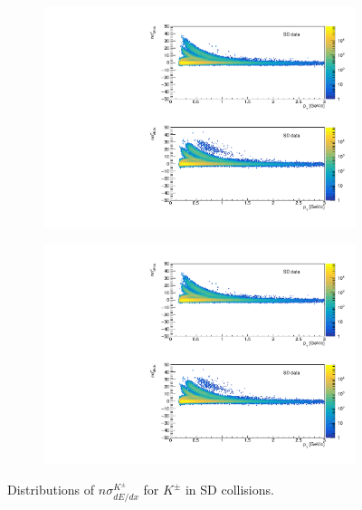 \begin{figure}[H]
{		\begin{subfigure}[b]{\linewidth}{
				{\includegraphics[width=\linewidth, page=19]{graphics/pid/spectraFit_SDT.pdf}}}
		\end{subfigure}
	}
	\parbox{0.3\textwidth}{
			\centering
			\begin{subfigure}[b]{\linewidth}{
					{\includegraphics[width=\linewidth, page=20]{graphics/pid/spectraFit_SDT.pdf}}}
			\end{subfigure}
		}
	\caption[Distributions of $n\sigma^{K^\pm}_{dE/dx}$ for $K^\pm$ in SD collisions]{Distributions of $n\sigma^{K^\pm}_{dE/dx}$ for $K^\pm$ in SD collisions.}
	\label{fig:nsigmaKfit}
\end{figure}

